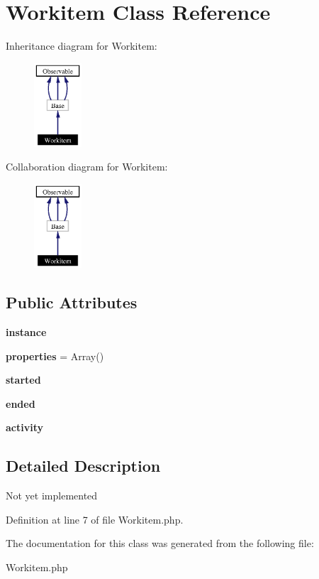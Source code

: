 \section{Workitem Class Reference}
\label{classWorkitem}
Inheritance diagram for Workitem:\begin{figure}[H]
\begin{center}
\leavevmode
\includegraphics[width=50pt]{classWorkitem__inherit__graph}
\end{center}
\end{figure}
Collaboration diagram for Workitem:\begin{figure}[H]
\begin{center}
\leavevmode
\includegraphics[width=50pt]{classWorkitem__coll__graph}
\end{center}
\end{figure}
\subsection*{Public Attributes}
\begin{CompactItemize}
\item 
{}
{\bf instance}\label{classWorkitem_m0}

\item 
{}
{\bf properties} = Array()\label{classWorkitem_m1}

\item 
{}
{\bf started}\label{classWorkitem_m2}

\item 
{}
{\bf ended}\label{classWorkitem_m3}

\item 
{}
{\bf activity}\label{classWorkitem_m4}

\end{CompactItemize}


\subsection{Detailed Description}
Not yet implemented 



Definition at line 7 of file Workitem.php.

The documentation for this class was generated from the following file:\begin{CompactItemize}
\item 
Workitem.php\end{CompactItemize}
